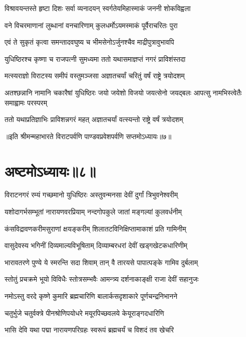 \twolineshloka
{विश्रावयन्तस्ते हृष्टा दिशः सर्वा व्यनादयन्}
{स्वर्गतेयमिहास्माकं जननी शोकविह्वला}


\twolineshloka
{वने विचरमाणानां लुब्धानां वनचारिणाम्}
{कुलधर्मोऽयमस्माकं पूर्वैराचरितः पुरा}


\twolineshloka
{एवं ते सुकृतं कृत्वा समन्तादवघुष्य च}
{भीमसेनोऽर्जुनश्चैव माद्रीपुत्रावुभावपि}


\twolineshloka
{युधिष्ठिरश्च कृष्णा च राजपत्नी सुमध्यमा}
{ततो यथासमाज्ञप्तं नगरं प्राविशंस्तदा}


\twolineshloka
{मत्स्यराज्ञो विराटस्य समीपं वस्तुमञ्जसा}
{अज्ञातचर्यां चरितुं वर्षं राष्ट्रे त्रयोदशम्}


\threelineshloka
{अतश्छन्नानि नामानि चकारैषां युधिष्ठिरः}
{जयो जयेशो विजयो जयत्सेनो जयद्बलः}
{आपत्सु नामभिस्त्वेतैः समाह्वामः परस्परम्}


\twolineshloka
{ततो यथाप्रतिज्ञाभिः प्राविशन्नगरं महत्}
{अज्ञातचर्यां वत्स्यन्तो राष्ट्रे वर्षं त्रयोदशम्}

॥इति श्रीमन्महाभारते विराटपर्वणि पाण्डवप्रवेशपर्वणि सप्तमोऽध्यायः॥७॥

\chapter{अष्टमोऽध्यायः॥८॥}

\twolineshloka
{विराटनगरं रम्यं गच्छमानो युधिष्ठिरः}
{अस्तुवन्मनसा देवीं दुर्गां त्रिभुवनेश्वरीम्}


\twolineshloka
{यशोदागर्भसम्भूतां नारायणवरप्रियाम्}
{नन्दगोपकुले जातां मङ्गल्यां कुलवर्धनीम्}


\twolineshloka
{कंसविद्रावणकरीमसुराणां क्षयङ्करीम्}
{शिलातटविनिक्षिप्तामाकाशं प्रति गामिनीम्}


\twolineshloka
{वासुदेवस्य भगिनीं दिव्यमाल्यविभूषिताम्}
{दिव्याम्बरधरां देवीं खड्गखेटकधारिणीम्}


\twolineshloka
{भारावतरणे पुण्ये ये स्मरन्ति सदा शिवाम्}
{तान् वै तारयसे पापात्पङ्के गामिव दुर्बलाम्}


\twolineshloka
{स्तोतुं प्रचक्रमे भूयो विविधैः स्तोत्रसम्भवैः}
{आमन्त्र्य दर्शनाकाङ्क्षी राजा देवीं सहानुजः}


\twolineshloka
{नमोऽस्तु वरदे कृष्णे कुमारि ब्रह्मचारिणि}
{बालार्कसदृशाकारे पूर्णचन्द्रनिभानने}


\twolineshloka
{चतुर्भुजे चतुर्वक्त्रे पीनश्रोणिपयोधरे}
{मयूरपिच्छवलये केयूराङ्गदधारिणि}


\twolineshloka
{भासि देवि यथा पद्मा नारायणपरिग्रहः}
{स्वरूपं ब्रह्मचर्यं च विशदं तव खेचरि}


